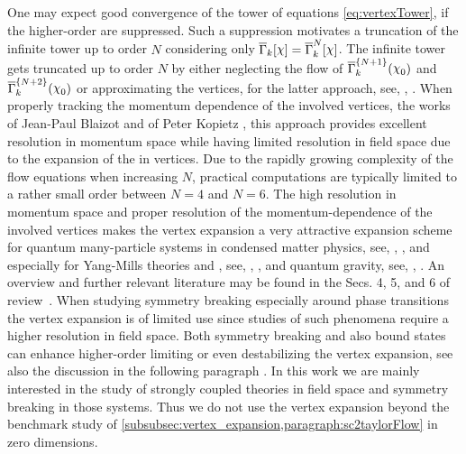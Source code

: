 One may expect good convergence of the tower of equations \eqref{eq:vertexTower}, if the higher-order \nptFunctions{} are suppressed.
Such a suppression motivates a truncation of the infinite tower up to order $N$ considering only $\FSeaa_k[\FSmf{\FSsf}]=\FSeaa_k^N[\FSmf{\FSsf}]$.
The infinite tower gets truncated up to order $N$ by either neglecting the flow of $\FSeaa_k^{\{N+1\}}(\FSmf{\FSsf}_0)$ and $\FSeaa_k^{\{N+2\}}(\FSmf{\FSsf}_0)$ or approximating the vertices, for the latter approach, see, \eg{}, .
When properly tracking the momentum dependence of the involved \ipi{} vertices, \cf{} the works~\cite{Blaizot:2004qa,Blaizot:2006vr, Blaizot:2006ak} of Jean-Paul Blaizot \etal{} and  of Peter Kopietz \etal{}, this approach provides excellent resolution in momentum space while having limited resolution in field space due to the expansion of the \eaa{} in \ipi{} vertices.
Due to the rapidly growing complexity of the flow equations when increasing $N$, practical computations are typically limited to a rather small order between $N=4$ and $N=6$.
The high resolution in momentum space and proper resolution of the momentum-dependence of the involved \ipi{} vertices makes the vertex expansion a very attractive expansion scheme for quantum many-particle systems in condensed matter physics, see, \eg{}, , \hep{} and especially for Yang-Mills theories and \qcd{}, see, \eg{}, , and quantum gravity, see, \eg{}, .
An overview and further relevant literature may be found in the Secs. 4, 5, and 6 of review~\cite{Dupuis:2020fhh}.
When studying symmetry breaking \dash{}  especially around phase transitions \dash{} the vertex expansion is of limited use since studies of such phenomena require a higher resolution in field space. 
Both symmetry breaking and also bound states can enhance higher-order \nptFunctions{} limiting or even destabilizing the vertex expansion, see also the discussion in the following paragraph .
In this work we are mainly interested in the study of strongly coupled theories in field space and symmetry breaking in those systems. 
Thus we do not use the vertex expansion beyond the benchmark study of \cref{subsubsec:vertex_expansion,paragraph:sc2taylorFlow} in zero dimensions.

